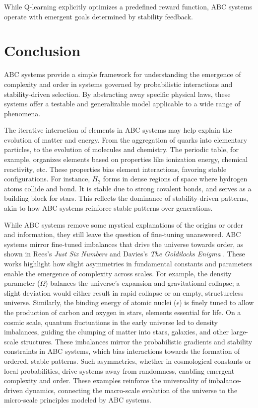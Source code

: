 \documentclass[entropy,article,submit,pdftex,moreauthors]{Definitions/mdpi}
\begin{document}
While Q-learning explicitly optimizes a predefined reward function, ABC systems operate with emergent goals determined by stability feedback. 

\section{Conclusion}

ABC systems provide a simple framework for understanding the emergence of complexity and order in systems governed by probabilistic interactions and stability-driven selection. By abstracting away specific physical laws, these systems offer a testable and generalizable model applicable to a wide range of phenomena. 

The iterative interaction of elements in ABC systems may help explain the evolution of matter and energy. From the aggregation of quarks into elementary particles, to the evolution of molecules and chemistry. The periodic table, for example, organizes elements based on properties like ionization energy, chemical reactivity, etc. These properties bias element interactions, favoring stable configurations. For instance, \( H_2 \) forms in dense regions of space where hydrogen atoms collide and bond. It is stable due to strong covalent bonds, and serves as a building block for stars. This reflects the dominance of stability-driven patterns, akin to how ABC systems reinforce stable patterns over generations. 

While ABC systems remove some mystical explanations of the origins or order and information, they still leave the question of fine-tuning unanswered. ABC systems mirror fine-tuned imbalances that drive the universe towards order, as shown in Rees's \textit{Just Six Numbers} \cite{rees2000just} and Davies's \textit{The Goldilocks Enigma} \cite{davies2006goldilocks}. These works highlight how slight asymmetries in fundamental constants and parameters enable the emergence of complexity across scales. For example, the density parameter (\(\Omega\)) balances the universe's expansion and gravitational collapse; a slight deviation would either result in rapid collapse or an empty, structureless universe. Similarly, the binding energy of atomic nuclei (\(\epsilon\)) is finely tuned to allow the production of carbon and oxygen in stars, elements essential for life. On a cosmic scale, quantum fluctuations in the early universe led to density imbalances, guiding the clumping of matter into stars, galaxies, and other large-scale structures. These imbalances mirror the probabilistic gradients and stability constraints in ABC systems, which bias interactions towards the formation of ordered, stable patterns. Such asymmetries, whether in cosmological constants or local probabilities, drive systems away from randomness, enabling emergent complexity and order. These examples reinforce the universality of imbalance-driven dynamics, connecting the macro-scale evolution of the universe to the micro-scale principles modeled by ABC systems.
\end{document}
